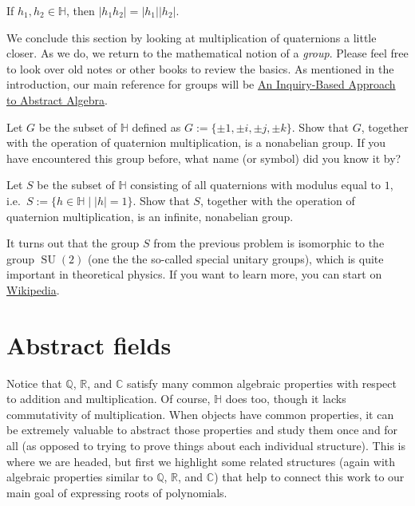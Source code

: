 \begin{fact}
If $h_1,h_2\in \mathbb{H}$, then $|h_1h_2| = |h_1||h_2|$.
\end{fact}

We conclude this section by looking at multiplication of quaternions a little closer. As we do, we return to the mathematical notion of a \emph{group}. Please feel free to look over old notes or other books to review the basics. As mentioned in the introduction, our main reference for groups will be  \href{https://github.com/dcernst/IBL-AbstractAlgebra/blob/master/Spring2018/IBL-AbstractAlgebra.pdf}{An Inquiry-Based Approach to Abstract Algebra}.

\begin{problem}
Let $G$ be the subset of $\mathbb{H}$ defined as $G:=\{\pm1,\pm i,\pm j,\pm k\}$. Show that $G$, together with the operation of quaternion multiplication, is a nonabelian group. If you have encountered this group before, what name (or symbol) did you know it by?
\end{problem}

\begin{problem}
Let $S$ be the subset of $\mathbb{H}$ consisting of all quaternions with modulus equal to $1$, i.e.~$S:=\{h\in \mathbb{H}\mid |h| = 1\}$. Show that $S$, together with the operation of quaternion multiplication, is an infinite, nonabelian group.
\end{problem}

It turns out that the group $S$ from the previous problem is isomorphic to the group $\operatorname{SU}(2)$ (one the the so-called special unitary groups), which is quite important in theoretical physics. If you want to learn more, you can start on \href{https://en.wikipedia.org/wiki/Special_unitary_group#The_group_SU(2)}{Wikipedia}.

\section{Abstract fields}
Notice that $\mathbb{Q}$, $\mathbb{R}$, and $\mathbb{C}$ satisfy many common algebraic properties with respect to addition and multiplication. Of course, $\mathbb{H}$ does too, though it lacks commutativity of multiplication. When objects have common properties, it can be extremely valuable to abstract  those properties and study them once and for all (as opposed to trying to prove things about each individual structure). This is where we are headed, but first we highlight some related structures (again with algebraic properties similar to $\mathbb{Q}$, $\mathbb{R}$, and $\mathbb{C}$) that help to connect this work to our main goal of expressing roots of polynomials.


